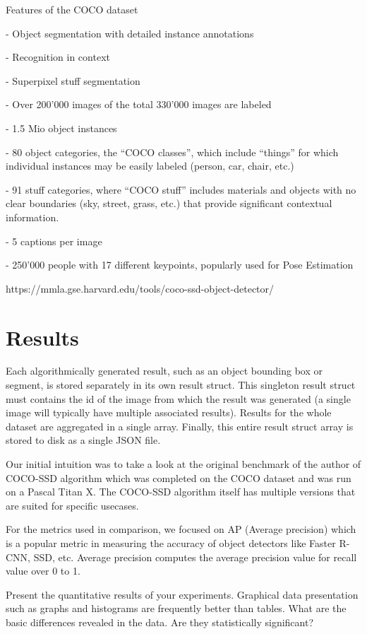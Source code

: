 \documentclass[runningheads,a4paper,11pt]{report}
\begin{document}
Features of the COCO dataset

    - Object segmentation with detailed instance annotations
    
    - Recognition in context
    
    - Superpixel stuff segmentation
    
    - Over 200’000 images of the total 330’000 images are labeled
    
    - 1.5 Mio object instances
    
    - 80 object categories, the “COCO classes”, which include “things” for which individual instances may be easily labeled (person, car, chair, etc.)
    
    - 91 stuff categories, where “COCO stuff” includes materials and objects with no clear boundaries (sky, street, grass, etc.) that provide significant contextual information.
    
    - 5 captions per image
    
    - 250’000 people with 17 different keypoints, popularly used for Pose Estimation


https://mmla.gse.harvard.edu/tools/coco-ssd-object-detector/


\section{Results}
\label{section:results}

Each algorithmically generated result, such as an object bounding box or segment, is stored separately in its own result struct. This singleton result struct must contains the id of the image from which the result was generated (a single image will typically have multiple associated results). Results for the whole dataset are aggregated in a single array. Finally, this entire result struct array is stored to disk as a single JSON file.

Our initial intuition was to take a look at the original benchmark of the author of COCO-SSD algorithm which was completed on the COCO dataset and was run on a Pascal Titan X. The COCO-SSD algorithm itself has multiple versions that are suited for specific usecases.

For the metrics used in comparison, we focused on AP (Average precision) which is a popular metric in measuring the accuracy of object detectors like Faster R-CNN, SSD, etc. Average precision computes the average precision value for recall value over 0 to 1. 

Present the quantitative results of your experiments. Graphical data presentation such as graphs and histograms are frequently better than tables. What are the basic differences revealed in the data. Are they statistically significant?
\end{document}
